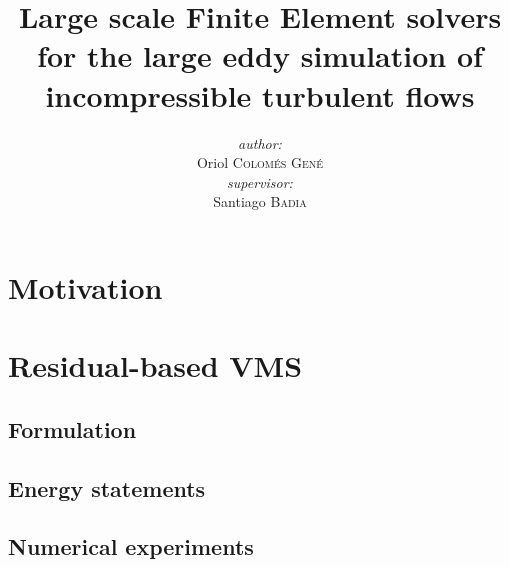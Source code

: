 \documentclass[11 pt,t]{beamer}
\author{\emph{author:}\\
Oriol \textsc{Colomés Gené}\\[0.2cm]
\emph{supervisor:}\\
Santiago \textsc{Badia}}
\title{Large scale Finite Element solvers for the large eddy simulation of incompressible turbulent flows}
\institute{Departament d'Enginyeria Civil i Ambiental}
\begin{document}
\addtocounter{framenumber}{-1}
\frame{\titlepage}

\section{Motivation}

\section{Residual-based VMS}

\subsection{Formulation}

\subsection{Energy statements}

\subsection{Numerical experiments}

\end{document}
